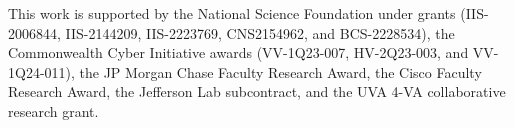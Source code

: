 \documentclass[acmsmall, screen]{acmart}
\begin{document}
\begin{acks}
This work is supported by the National Science
Foundation under grants (IIS-2006844, IIS-2144209, IIS-2223769,
CNS2154962, and BCS-2228534), the Commonwealth Cyber Initiative awards (VV-1Q23-007, HV-2Q23-003, and VV-1Q24-011), the JP Morgan
Chase Faculty Research Award, the Cisco Faculty Research Award,
the Jefferson Lab subcontract, and the UVA 4-VA collaborative research grant.
\end{acks}





\appendix







\end{document}
